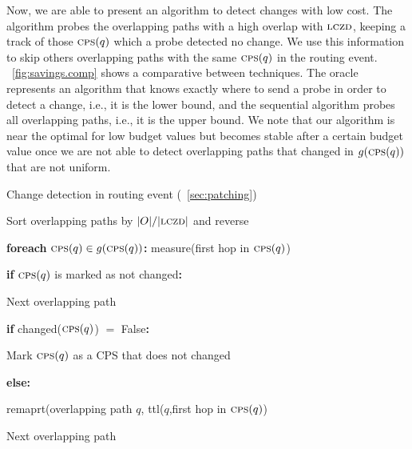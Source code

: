 Now, we are able to present an algorithm to detect
changes with low cost. The algorithm probes the overlapping paths with
a high overlap with $\mathrm{\textsc{lczd}}$, keeping a track of those $\mathrm{\textsc{cps}}(q)$ which a probe
detected no change. We use this information to skip others overlapping paths 
with the same $\mathrm{\textsc{cps}}(q)$ in the routing event. \figstr~\ref{fig:savings.comp}
shows a comparative between techniques. The oracle represents an algorithm that
knows exactly where to send a probe in order to detect a change, i.e., 
it is the lower bound, and the sequential algorithm probes all overlapping paths,
i.e., it is the upper bound. We note that our algorithm is near the optimal
for low budget values but becomes stable after a certain budget value
once we are not able to detect overlapping paths that changed in $g(\mathrm{\textsc{cps}}(q))$ that 
are not uniform.  

    


\begin{algorithm}[h]
\caption{Change detection in routing event (\secstr~\ref{sec:patching})}

Sort overlapping paths by $|O|/|\mathrm{\textsc{lczd}}|$ and reverse\;

\textbf{foreach} $\mathrm{\textsc{cps}}(q) \in g(\mathrm{\textsc{cps}}(q))$\textbf{:} 
\Indp
measure(first hop in $\mathrm{\textsc{cps}}(q)$)

\textbf{if} $\mathrm{\textsc{cps}}(q)$ is marked as not changed\textbf{:}
    
    Next overlapping path\;

\textbf{if} changed($\mathrm{\textsc{cps}}(q)$) $=$ False\textbf{:}
    
    Mark $\mathrm{\textsc{cps}}(q)$ as a CPS that does not changed\;

\textbf{else:}
    
    remaprt(overlapping path $q$, ttl($q$,first hop in $\mathrm{\textsc{cps}}(q)$)\;

Next overlapping path\;

\end{algorithm}

